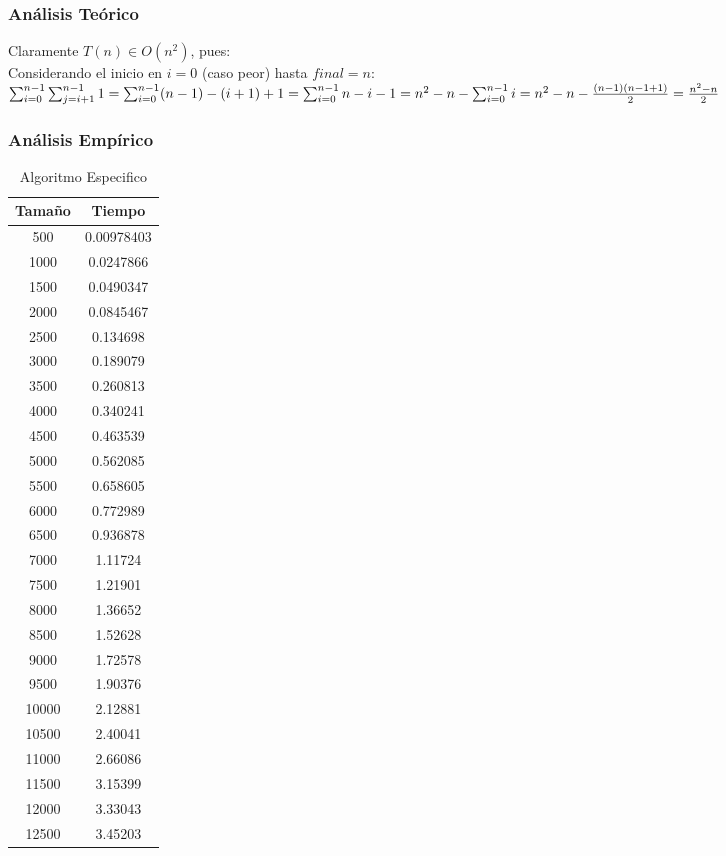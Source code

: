 \documentclass[a4paper,12pt,twoside]{article} %
\begin{document}
\newpage

\subsubsection{Análisis Teórico}

Claramente $T(n) \in O(n^2)$, pues:\\

Considerando el inicio en $i=0$ (caso peor) hasta $final=n$:\\

$\sum_{i=0}^{n-1} \sum_{j=i+1}^{n-1} 1 = 
\sum_{i=0}^{n-1} (n-1)-(i+1)+1 =
\sum_{i=0}^{n-1} n-i-1 =\\
n^2 - n - \sum_{i=0}^{n-1} i =
n^2 - n - \frac{(n-1)(n-1+1)}{2}= \frac{n^2-n}{2}$



\subsubsection{Análisis Empírico}


\begin{table}[h]
	\begin{center}
		\begin{tabular}{|c|c|}
		\hline
		Tamaño & Tiempo \\
		\hline
		500 & 0.00978403 \\
		1000 & 0.0247866 \\
		1500 & 0.0490347 \\
		2000 & 0.0845467 \\
		2500 & 0.134698 \\
		3000 & 0.189079 \\
		3500 & 0.260813 \\
		4000 & 0.340241 \\
		4500 & 0.463539 \\
		5000 & 0.562085 \\
		5500 & 0.658605 \\
		6000 & 0.772989 \\
		6500 & 0.936878 \\
		7000 & 1.11724 \\
		7500 & 1.21901 \\
		8000 & 1.36652 \\
		8500 & 1.52628 \\
		9000 & 1.72578 \\
		9500 & 1.90376 \\
		10000 & 2.12881 \\
		10500 & 2.40041 \\
		11000 & 2.66086 \\
		11500 & 3.15399 \\
		12000 & 3.33043 \\
		12500 & 3.45203 \\
		\hline
		\end{tabular}
	\end{center}
	\caption{Algoritmo Especifico}
\end{table}
\end{document}
